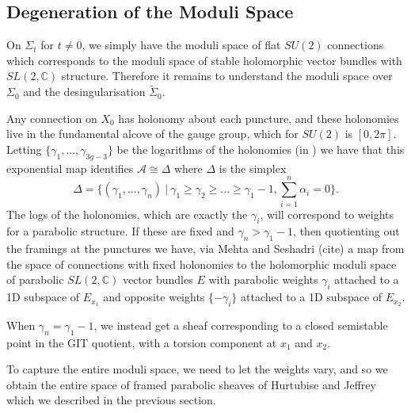 \documentclass[]{article}
\newcommand{\C}{\mathbb{C}}
\newcommand{\cA}{\mathcal{A}}
\begin{document}
\subsection{Degeneration of the Moduli Space}
	On $\Sigma_t$ for $t\neq 0$, we simply have the moduli space of flat $SU(2)$ connections which corresponds to the moduli space of stable holomorphic vector bundles with $SL(2,\C)$ structure. Therefore it remains to understand the moduli space over $\Sigma_0$ and the desingularisation $\tilde{\Sigma}_0$. 
	
	Any connection on $X_0$ has holonomy about each puncture, and these holonomies live in the fundamental alcove of the gauge group, which for $SU(2)$ is $[0,2\pi]$. Letting $\{\gamma_1,...,\gamma_{3g-3}\}$ be the logarithms of the holonomies (in )
	we have that this exponential map identifies $\cA \cong \Delta$ where $\Delta$ is the simplex 
	\begin{equation}
		\Delta = \{(\gamma_1,...,\gamma_n) ~|~ \gamma_1 \geq \gamma_2 \geq ... \geq \gamma_1 - 1, \sum_{i=1}^n \alpha_i =0\}.
	\end{equation}
	The logs of the holonomies, which are exactly the $\gamma_i$, will correspond to weights for a parabolic structure. If these are fixed and $\gamma_n > \gamma_1 -1$, then quotienting out the framings at the punctures we have, via Mehta and Seshadri (cite) a map from the space of connections with fixed holonomies to the holomorphic moduli space of parabolic $SL(2,\C)$ vector bundles $E$ with parabolic weights ${\gamma_i}$ attached to a 1D subspace of $E_{x_1}$ and opposite weights $\{-\gamma_i\}$ attached to a 1D subspace of $E_{x_2}$.
	
	When $\gamma_n = \gamma_1-1$, we instead get a sheaf corresponding to a closed semistable point in the GIT quotient, with a torsion component at $x_1$ and $x_2$. 
	
	To capture the entire moduli space, we need to let the weights vary, and so we obtain the entire space of framed parabolic sheaves of Hurtubise and Jeffrey which we described in the previous section. 
\end{document}
